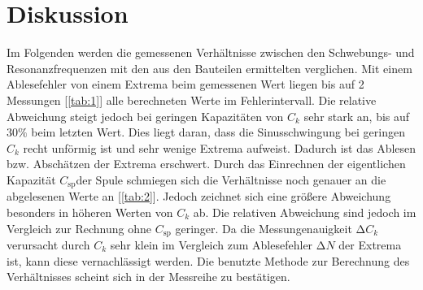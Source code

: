 \section{Diskussion}
\label{sec:Diskussion}
Im Folgenden werden die gemessenen Verhältnisse zwischen den Schwebungs- und Resonanzfrequenzen mit den aus den Bauteilen ermittelten verglichen.
Mit einem Ablesefehler von einem Extrema beim gemessenen Wert liegen bis auf 2 Messungen [\ref{tab:1}] alle berechneten Werte im Fehlerintervall.
Die relative Abweichung steigt jedoch bei geringen Kapazitäten von $C_k$ sehr stark an, bis auf $30\%$ beim letzten Wert.
Dies liegt daran, dass die Sinusschwingung bei geringen $C_k$ recht unförmig ist und sehr wenige Extrema aufweist.
Dadurch ist das Ablesen bzw. Abschätzen der Extrema erschwert.
Durch das Einrechnen der eigentlichen Kapazität $C_{\text{sp}}$der Spule schmiegen sich die Verhältnisse noch genauer an die abgelesenen Werte an [\ref{tab:2}].
Jedoch zeichnet sich eine größere Abweichung besonders in höheren Werten von $C_k$ ab.
Die relativen Abweichung sind jedoch im Vergleich zur Rechnung ohne $C_{\text{sp}}$ geringer.
Da die Messungenauigkeit $\increment C_k$ verursacht durch $C_k$ sehr klein im Vergleich zum Ablesefehler $\increment N$ der Extrema ist, kann diese vernachlässigt werden.
Die benutzte Methode zur Berechnung des Verhältnisses scheint sich in der Messreihe zu bestätigen.
